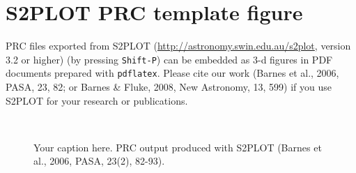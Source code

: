 \documentclass{article}
\begin{document}
\section*{S2PLOT PRC template figure}

PRC files exported from S2PLOT
(\url{http://astronomy.swin.edu.au/s2plot}, version 3.2 or higher) (by
pressing {\tt Shift-P}) can be embedded as 3-d figures in PDF
documents prepared with {\tt pdflatex}.  Please cite our work (Barnes
et al., 2006, PASA, 23, 82; or Barnes \& Fluke, 2008, New Astronomy,
13, 599) if you use S2PLOT for your research or publications.
\begin{figure}[h]
\caption{Your caption here.  PRC output produced with S2PLOT (Barnes et al., 2006, PASA, 23(2), 82-93).}
\begin{center}
  \vspace{0.12in}
  \\
\end{center}
\end{figure}
\end{document}

